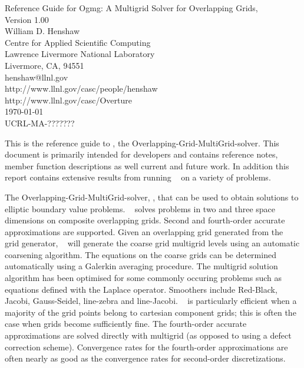 \documentclass[12pt]{article}
\begin{document}
\begin{flushleft}
{\Large
Reference Guide for Ogmg: A Multigrid Solver for Overlapping Grids, \\
Version 1.00 \\
}
\vspace{3\baselineskip}
William D. Henshaw   \\                    
\vspace{2\baselineskip}
Centre for Applied Scientific Computing \\
Lawrence Livermore National Laboratory    \\
Livermore, CA, 94551   \\
henshaw@llnl.gov \\
http://www.llnl.gov/casc/people/henshaw \\
http://www.llnl.gov/casc/Overture\\
\vspace{2\baselineskip}
\today\\
\vspace{\baselineskip}
UCRL-MA-???????


\vspace{4\baselineskip}

This is the reference guide to \Ogmg, the Overlapping-Grid-MultiGrid-solver.
This document is primarily intended for developers and contains reference notes,
member function descriptions as well current and future work. In addition this
report contains extensive results from running \Ogmg~ on a variety of problems.

The Overlapping-Grid-MultiGrid-solver, \Ogmg, that can be used to obtain solutions 
to elliptic boundary value problems.
\Ogmg~ solves problems in two and three space
dimensions on composite overlapping grids. 
Second and fourth-order accurate approximations are supported.
Given an overlapping grid generated from the \Ogen~  grid generator,
\Ogmg~  will generate the coarse grid multigrid levels using an automatic coarsening algorithm.
The equations on the coarse grids can be determined automatically using a Galerkin averaging
procedure.
The multigrid solution algorithm has been optimised for some commonly occuring problems such as
equations defined with the Laplace operator.
Smoothers include Red-Black, Jacobi, Gauss-Seidel, line-zebra and line-Jacobi.
\Ogmg~  is particularly efficient when a majority of the grid points belong to cartesian component grids;
this is often the case when grids become sufficiently fine.
The fourth-order accurate approximations are solved directly with multigrid (as opposed to using
a defect correction scheme). Convergence rates for the fourth-order approximations are often nearly as
good as the convergence rates for second-order discretizations.
\end{flushleft}
\end{document}
